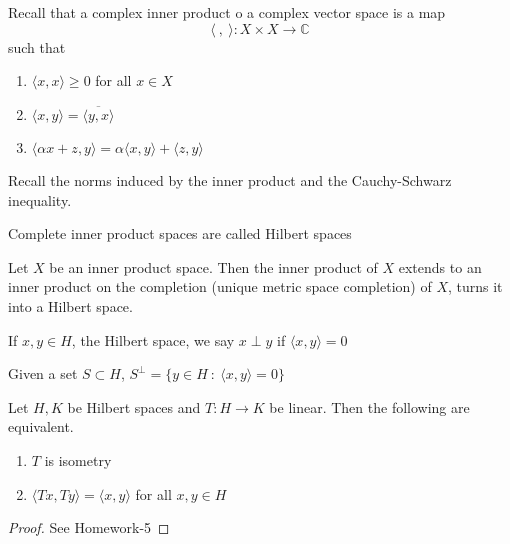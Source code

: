 
\chapter{}

\begin{definition}
  Recall that a complex inner product o a complex vector space is a
  map \[
    \langle \ , \  \rangle : X \times X \to \mathbb{C}
  \]
  such that
  \begin{enumerate}[label=(\arabic*)]
    \item $\langle x , x \rangle \ge 0$ for all $x \in X$
    \item $\langle  x , y \rangle  = \overline{\langle y , x \rangle }$
    \item $\langle \alpha x + z, y \rangle  = \alpha \langle x , y
      \rangle  + \langle z , y \rangle $
  \end{enumerate}
\end{definition}

Recall the norms induced by the inner product and the Cauchy-Schwarz inequality.

\begin{definition}
  Complete inner product spaces are called Hilbert spaces
\end{definition}

\begin{proposition}
  Let $X$ be an inner product space. Then the inner product of $X$
  extends to an inner product on the completion (unique metric space
  completion) of $X$, turns it into
  a Hilbert space.
\end{proposition}

\begin{definition}
  If $x, y \in H$, the Hilbert space, we say $x \perp y$ if $ \langle
  x , y \rangle  = 0$
\end{definition}

\begin{definition}
  Given a set $S \subset H$, $S^\perp = \{ y \in H  \ : \  \langle x
  , y \rangle  = 0 \}$
\end{definition}

\begin{proposition}
  Let $H, K$ be Hilbert spaces and $T: H \to K$ be linear. Then the
  following are equivalent.
  \begin{enumerate}[label=(\arabic*)]
    \item $T$ is isometry
    \item $\langle  Tx , Ty \rangle = \langle x , y \rangle $ for all
      $x, y \in H$
  \end{enumerate}
\end{proposition}
\begin{proof}
  See Homework-5
\end{proof}

